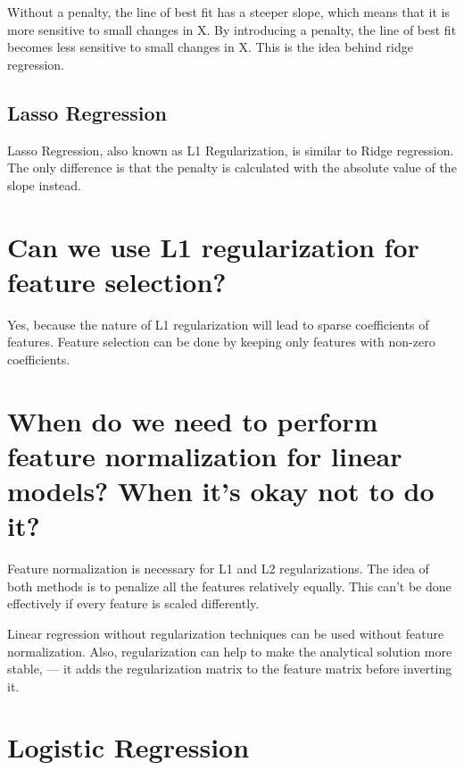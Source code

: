 \documentclass[
]{book}
\begin{document}
Without a penalty, the line of best fit has a steeper slope, which means that it is more sensitive to small changes in X. By introducing a penalty, the line of best fit becomes less sensitive to small changes in X. This is the idea behind ridge regression.

\hypertarget{lasso-regression}{%
\subsection{Lasso Regression}\label{lasso-regression}}

Lasso Regression, also known as L1 Regularization, is similar to Ridge regression. The only difference is that the penalty is calculated with the absolute value of the slope instead.

\hypertarget{can-we-use-l1-regularization-for-feature-selection}{%
\section{Can we use L1 regularization for feature selection?}\label{can-we-use-l1-regularization-for-feature-selection}}

Yes, because the nature of L1 regularization will lead to sparse coefficients of features. Feature selection can be done by keeping only features with non-zero coefficients.

\hypertarget{when-do-we-need-to-perform-feature-normalization-for-linear-models-when-its-okay-not-to-do-it}{%
\section{When do we need to perform feature normalization for linear models? When it's okay not to do it?}\label{when-do-we-need-to-perform-feature-normalization-for-linear-models-when-its-okay-not-to-do-it}}

Feature normalization is necessary for L1 and L2 regularizations. The idea of both methods is to penalize all the features relatively equally. This can't be done effectively if every feature is scaled differently.

Linear regression without regularization techniques can be used without feature normalization. Also, regularization can help to make the analytical solution more stable, --- it adds the regularization matrix to the feature matrix before inverting it.

\hypertarget{logistic-regression-1}{%
\section{Logistic Regression}\label{logistic-regression-1}}
\end{document}
